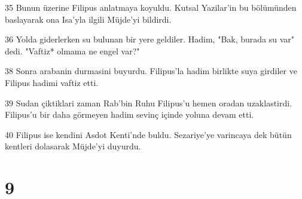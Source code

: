 \par 35 Bunun üzerine Filipus anlatmaya koyuldu. Kutsal Yazilar'in bu bölümünden baslayarak ona Isa'yla ilgili Müjde'yi bildirdi.
\par 36 Yolda giderlerken su bulunan bir yere geldiler. Hadim, "Bak, burada su var" dedi. "Vaftiz* olmama ne engel var?"
\par 38 Sonra arabanin durmasini buyurdu. Filipus'la hadim birlikte suya girdiler ve Filipus hadimi vaftiz etti.
\par 39 Sudan çiktiklari zaman Rab'bin Ruhu Filipus'u hemen oradan uzaklastirdi. Filipus'u bir daha görmeyen hadim sevinç içinde yoluna devam etti.
\par 40 Filipus ise kendini Asdot Kenti'nde buldu. Sezariye'ye varincaya dek bütün kentleri dolasarak Müjde'yi duyurdu.

\chapter{9}


